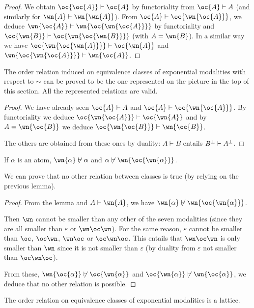 \begin{proof}
We obtain $\oc{\oc{A}}\vdash\oc{A}$ by functoriality from $\oc{A}\vdash A$ (and similarly for $\wn{A}\vdash\wn{\wn{A}}$).
From $\oc{A}\vdash \oc{\wn{\oc{A}}}$, we deduce $\wn{\oc{A}}\vdash \wn{\oc{\wn{\oc{A}}}}$ by functoriality and $\oc{\wn{B}}\vdash \oc{\wn{\oc{\wn{B}}}}$ (with $A=\wn{B}$). In a similar way we have $\oc{\wn{\oc{\wn{A}}}}\vdash \oc{\wn{A}}$ and $\wn{\oc{\wn{\oc{A}}}}\vdash \wn{\oc{A}}$.
\end{proof}

The order relation induced on equivalence classes of exponential
modalities with respect to \(\sim\) can be proved to be the one
represented on the picture in the top of this section. All the represented
relations are valid.

\begin{proof}
We have already seen $\oc{A}\vdash A$ and $\oc{A}\vdash \oc{\wn{\oc{A}}}$. By functoriality we deduce $\oc{\wn{\oc{A}}}\vdash \oc{\wn{A}}$ and by $A=\wn{\oc{B}}$ we deduce $\oc{\wn{\oc{B}}}\vdash \wn{\oc{B}}$.

The others are obtained from these ones by duality: $A\vdash B$ entails $B^\bot\vdash A^\bot$.
\end{proof}

\begin{lemma}
If $\alpha$ is an atom, $\wn{\alpha}\not\vdash\alpha$ and 
$\alpha\not\vdash\wn{\oc{\wn{\alpha}}}$.
\end{lemma}

We can prove that no other relation between classes is true (by relying
on the previous lemma).

\begin{proof}
From the lemma and $A\vdash\wn{A}$, we have $\wn{\alpha}\not\vdash\wn{\oc{\wn{\alpha}}}$.

Then $\wn$ cannot be smaller than any other of the seven modalities (since they are all smaller than $\varepsilon$ or $\wn\oc\wn$). For the same reason, $\varepsilon$ cannot be smaller than $\oc$, $\oc\wn$, $\wn\oc$ or $\oc\wn\oc$. This entails that $\wn\oc\wn$ is only smaller than $\wn$ since it is not smaller than $\varepsilon$ (by duality from $\varepsilon$ not smaller than $\oc\wn\oc$).

From these, $\wn{\oc{\alpha}}\not\vdash\oc{\wn{\alpha}}$ and $\oc{\wn{\alpha}}\not\vdash\wn{\oc{\alpha}}$, we deduce that no other relation is possible.
\end{proof}

The order relation on equivalence classes of exponential modalities is a
lattice.


